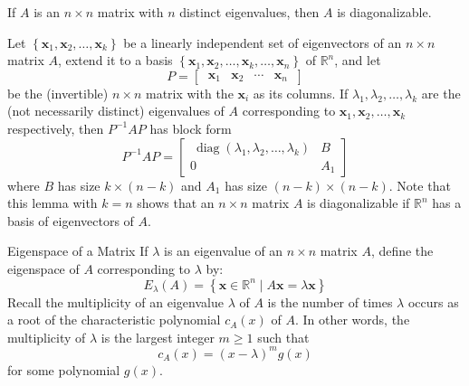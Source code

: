 \documentclass[12pt]{article}
\begin{document}
\begin{theorem}{}{}
    If $ A $ is an $ n \times n $ matrix with $ n $ distinct eigenvalues, then $ A $ is diagonalizable.
\end{theorem}

\begin{lemma}{}{}
    Let $ \left\{ \mathbf{x}_1, \mathbf{x}_2, \dots, \mathbf{x}_k \right\} $ be a linearly independent set of eigenvectors of an $ n \times n $ matrix $ A $, extend it to a basis $ \left\{ \mathbf{x}_1, \mathbf{x}_2, \dots, \mathbf{x}_k, \dots, \mathbf{x}_n \right\} $ of $ \mathbb{R}^n $, and let
    \[ P = \begin{bmatrix} \ \mathbf{x}_1 & \mathbf{x}_2 & \cdots & \mathbf{x}_n \ \end{bmatrix} \]
    be the (invertible) $ n \times n $ matrix with the $ \mathbf{x}_i $ as its columns. If $ \lambda_1, \lambda_2, \dots, \lambda_k $ are the (not necessarily distinct) eigenvalues of $ A $ corresponding to $ \mathbf{x}_1, \mathbf{x}_2, \dots, \mathbf{x}_k $ respectively, then $ P^{-1} A P $ has block form
    \[ P^{-1} A P = \begin{bmatrix} \ \operatorname{diag} \left( \lambda_1, \lambda_2, \dots, \lambda_k \right) & B \ \\ 0 & A_1 \end{bmatrix} \]
    where $ B $ has size $ k \times \left( n - k \right) $ and $ A_1 $ has size $ \left( n - k \right) \times \left( n - k \right) $.
    \medskip
    \newline
    Note that this lemma with $ k = n $ shows that an $ n \times n $ matrix $ A $ is diagonalizable if $ \mathbb{R}^n $ has a basis of eigenvectors of $ A $.
\end{lemma}

\begin{definition}{Eigenspace of a Matrix}{}
    If $ \lambda $ is an eigenvalue of an $ n \times n $ matrix $ A $, define the eigenspace of $ A $ corresponding to $ \lambda $ by:
    \[ E_\lambda \left( A \right) = \left\{ \mathbf{x} \in \mathbb{R}^n \mid A \mathbf{x} = \lambda \mathbf{x} \right\} \]
    Recall the multiplicity of an eigenvalue $ \lambda $ of $ A $ is the number of times $ \lambda $ occurs as a root of the characteristic polynomial $ c_A \left( x \right) $ of $ A $. In other words, the multiplicity of $ \lambda $ is the largest integer $ m \geq 1 $ such that
    \[ c_A \left( x \right) = \left( x - \lambda \right)^m g \left( x \right) \]
    for some polynomial $ g \left( x \right) $.
\end{definition}
\end{document}
